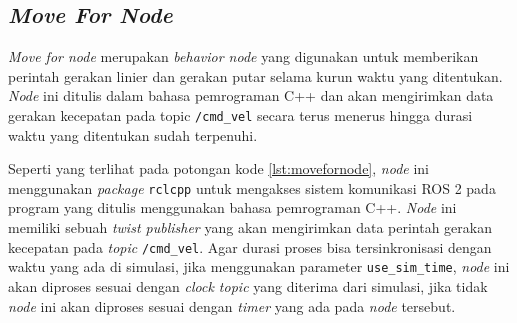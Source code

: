 \subsection{\emph{Move For Node}}
\label{subsec:movefornode}

\emph{Move for node} merupakan \emph{behavior node} yang digunakan untuk memberikan perintah gerakan linier dan gerakan putar selama kurun waktu yang ditentukan.
\emph{Node} ini ditulis dalam bahasa pemrograman C++ dan akan mengirimkan data gerakan kecepatan pada topic \lstinline{/cmd_vel} secara terus menerus hingga durasi waktu yang ditentukan sudah terpenuhi.



Seperti yang terlihat pada potongan kode \ref{lst:movefornode},
  \emph{node} ini menggunakan \emph{package} \lstinline{rclcpp} untuk mengakses sistem komunikasi ROS 2 pada program yang ditulis menggunakan bahasa pemrograman C++.
\emph{Node} ini memiliki sebuah \emph{twist publisher} yang akan mengirimkan data perintah gerakan kecepatan pada \emph{topic} \lstinline{/cmd_vel}.
Agar durasi proses bisa tersinkronisasi dengan waktu yang ada di simulasi,
  jika menggunakan parameter \lstinline{use_sim_time},
  \emph{node} ini akan diproses sesuai dengan \emph{clock topic} yang diterima dari simulasi,
  jika tidak \emph{node} ini akan diproses sesuai dengan \emph{timer} yang ada pada \emph{node} tersebut.
